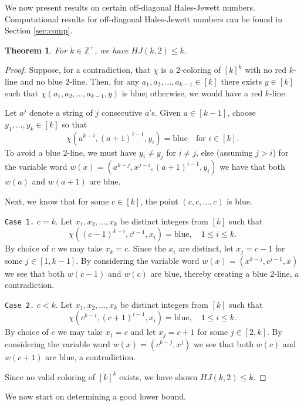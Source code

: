 \documentclass[11pt]{article}
\newtheorem{thm}{Theorem}
\theoremstyle{definition}
\begin{document}
We now present results on certain off-diagonal Hales-Jewett numbers. Computational results for
off-diagonal Hales-Jewett numbers can be found in
Section \ref{sec:comp}. 


 
\begin{thm}\label{thm1} For $k \in \mathbb{Z}^+$, we have $HJ(k,2) \leq k$.
\end{thm}



\begin{proof} Suppose, for a contradiction, that $\chi$ is a 2-coloring of $[k]^k$ with no
red $k$-line and no blue $2$-line.  Then, for any $a_1,a_2,\dots,a_{k-1} \in [k]$ there exists
$y \in [k]$ such that $\chi(a_1,a_2,\dots,a_{k-1},y)$ is blue; otherwise, we would have a red $k$-line.

Let $a^{j}$ denote a string of $j$ consecutive $a$'s.
Given $a \in [k-1]$, 
choose $y_1,  \dots, y_k \in [k]$ so that
$$
\chi(a^{k-i} ,(a+1)^{i-1},y_i) = \mbox{blue} \quad \mbox{for $i \in [k]$}.
$$
To avoid a blue $2$-line, we must have $y_i \neq y_j$ for $i \neq j$, else (assuming $j>i$)
for the variable word  $w(x) = (a^{k-j}, x^{j-i},(a+1)^{i-1},y_i)$ 
we have that both $w(a)$ and $w(a+1)$ are blue.

Next, we know that for some $c \in [k]$, the point $(c,c,\dots,c)$ is blue.

\noindent
{\tt Case 1.} $c=k$.  Let $x_1,x_2,\dots,x_k$ be distinct integers from $[k]$ such that
$$
\chi((c-1)^{k-i} ,c^{i-1},x_i) = \mbox{blue}, \quad \mbox{$1 \leq i \leq k$}.
$$
By choice of $c$ we may take $x_k=c$.  Since the $x_i$ are distinct,
let $x_j=c-1$ for some $j \in [1,k-1]$.  By considering the variable word $w(x) = (x^{k-j},c^{j-1},x)$ we
see that both $w(c-1)$ and $w(c)$ are blue, thereby creating a blue 2-line, a contradiction.

\noindent
{\tt Case 2.} $c<k$. Let $x_1,x_2,\dots,x_k$ be distinct integers from $[k]$ such that
$$
\chi(c^{k-i} ,(c+1)^{i-1},x_i) = \mbox{blue}, \quad \mbox{$1 \leq i \leq k$}.
$$ 
By choice of $c$ we may take $x_1=c$ and let $x_j=c+1$ for
some $j \in [2,k]$. By considering the
variable word $w(x) = (c^{k-j},x^j)$ we see that both
$w(c)$ and $w(c+1)$ are blue, a contradiction.

Since no valid coloring of $[k]^k$ exists, we have shown $HJ(k,2) \leq k$.
\end{proof}

We now start on determining a good lower bound.
\end{document}
